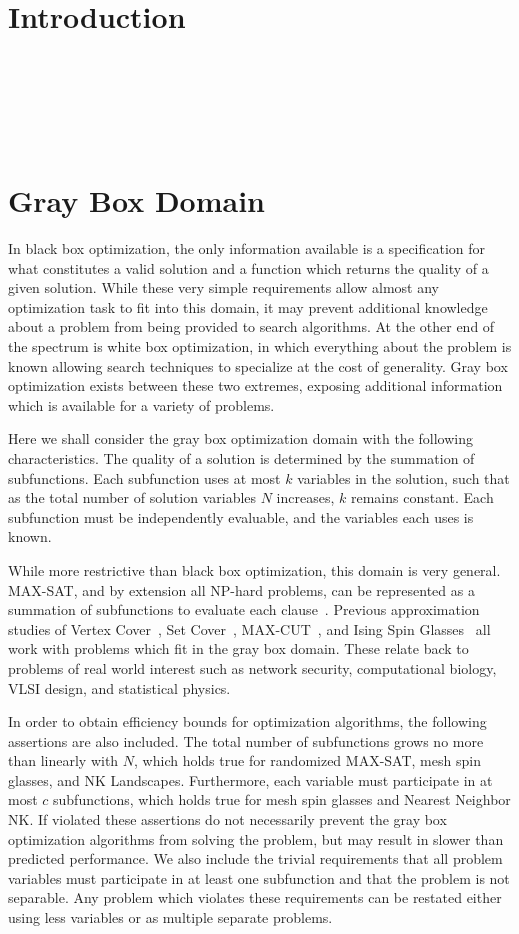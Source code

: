 \documentclass{sig-alternate}
\begin{document}
\section{Introduction}
~\cite{chen:2011:memetic}

~\cite{whitley:2013:greedy}~\cite{chicano:2014:ball}

~\cite{goldman:2014:p3}

\section{Gray Box Domain}
\label{sec-gray-box}
In black box optimization, the only information available is a specification
for what constitutes a valid solution and a function which returns the quality
of a given solution. While these very simple requirements allow almost any
optimization task to fit into this domain, it may prevent additional knowledge
about a problem from being provided to search algorithms. At the other end of
the spectrum is white box optimization, in which everything about the problem
is known allowing search techniques to specialize at the cost of generality.
Gray box optimization exists between these two extremes, exposing additional
information which is available for a variety of problems.

Here we shall consider the gray box optimization domain with the following
characteristics. The quality of a solution is determined by the summation
of subfunctions. Each subfunction uses at most $k$ variables in the solution,
such that as the total number of solution variables $N$ increases, $k$ remains constant.
Each subfunction must be independently evaluable, and the variables each uses is known.

While more restrictive than black box optimization, this domain is very general.
MAX-SAT, and by extension all NP-hard problems, can be represented
as a summation of subfunctions to evaluate each clause~\cite{whitley:2013:greedy}.
Previous approximation studies of Vertex Cover~\cite{oliveto:2009:vertexcover},
Set Cover~\cite{yu:2010:setcover}, MAX-CUT~\cite{festa:2002:maxcut}, and
Ising Spin Glasses~\cite{pelikan:2003:hboaising} all work with problems which fit
in the gray box domain. These relate back to problems of real world interest such
as network security, computational biology, VLSI design, and statistical physics.

In order to obtain efficiency bounds for optimization algorithms, the following
assertions are also included. The total number of subfunctions grows no more than
linearly with $N$, which holds true for randomized MAX-SAT, mesh spin glasses, and NK Landscapes.
Furthermore, each variable must participate in at most $c$ subfunctions, which holds true
for mesh spin glasses and Nearest Neighbor NK. If violated these assertions do not
necessarily prevent the gray box optimization algorithms from solving the problem, but may result
in slower than predicted performance.
We also include the trivial requirements that all problem variables must participate
in at least one subfunction and that the problem is not separable. Any problem which
violates these requirements can be restated either using less variables or as multiple separate problems.
\end{document}
